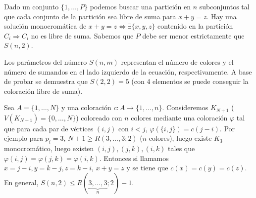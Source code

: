 \documentclass[TGyGC.tex]{subfiles}
\begin{document}
Dado un conjunto $\{1,\dots, P\}$ podemos buscar una partición en $n$ subconjuntos tal que cada conjunto de la partición sea libre de suma para $x+y=z$. Hay una solución monocromática de $x+y=z\Leftrightarrow\exists\{x,y,z\}$ contenido en la partición $C_i\Rightarrow C_i$ no es libre de suma. Sabemos que $P$ debe ser menor estrictamente que $S(n,2)$. 

Los parámetros del número $S(n,m)$ representan el número de colores y el número de sumandos en el lado izquierdo de la ecuación, respectivamente. A base de probar se demuestra que $S(2,2)=5$ (con 4 elementos se puede conseguir la coloración libre de suma). 

Sea $A =\{1,\dots, N\}$ y una coloración $c:A\to \{1,\dots, n\}$. Consideremos $K_{N+1}$ ($V(K_{N+1})=\{0,\dots, N\}$) coloreado con $n$ colores mediante una coloración $\varphi$ tal que para cada par de vértices  $(i,j)$ con $i<j$, $\varphi(\{i,j\})=c(j-i)$. Por ejemplo para $p_i=3$, $N+1\geq R(3,\dots, 3;2)$ ($n$ colores), luego existe $K_3$ monocromático, luego existen $(i,j), (j,k), (i,k)$ tales que $\varphi(i,j)=\varphi(j,k)=\varphi(i,k)$. Entonces si llamamos $x=j-i, y=k-j, z=k-i$, $x+y=z$ y se tiene que $c(x)=c(y)=c(z)$. En general, $S(n,2)\leq R(\underbrace{3,\dots, 3}_{n};2)-1$. 
\end{document}
